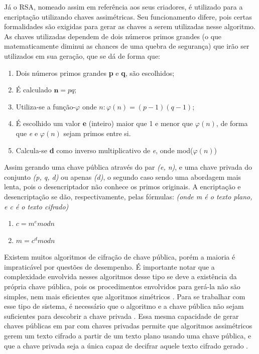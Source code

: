 	Já o RSA, nomeado assim em referência aos seus criadores, é utilizado para a encriptação utilizando chaves assimétricas. Seu funcionamento difere, pois certas formalidades são exigidas para gerar as chaves a serem utilizadas nesse algoritmo. As chaves utilizadas dependem de dois números primos grandes (o que matematicamente diminui as chances de uma quebra de segurança) que irão ser utilizados em sua geração, que se dá de forma que:
	
	\begin{enumerate}
		\item Dois números primos grandes \textbf{p} e \textbf{q}, são escolhidos;
		\item É calculado $\textbf{n} = pq$;
		\item Utiliza-se a função-$\varphi$ onde $n: \varphi(n) = (p-1)(q-1)$;
		\item É escolhido um valor \textbf{e} (inteiro) maior que 1 e menor que $\varphi(n)$, de forma que \textit{e} e $\varphi(n)$ sejam primos entre si.
		\item Calcula-se \textbf{d} como inverso multiplicativo de \textit{e}, onde mod($\varphi(n)$)
	\end{enumerate}
	
	Assim gerando uma chave pública através do par \textit{(e, n)}, e uma chave privada do conjunto \textit{(p, q, d)} ou apenas \textit{(d)}, o segundo caso sendo uma abordagem mais lenta, pois o desencriptador não conhece os primos originais. A encriptação e desencriptação se dão, respectivamente, pelas fórmulas: \textit{(onde m é o texto plano, e c é o texto cifrado)}
	
	\begin{enumerate}
		\item $c = m^e mod n$
		\item $m = c^d mod n$
	\end{enumerate}
	
	Existem muitos algoritmos de cifração de chave pública, porém a maioria é impraticável por questões de desempenho. É importante notar que a complexidade envolvida nesses algoritmos desse tipo se deve a existência da própria chave pública, pois os procedimentos envolvidos para gerá-la não são simples, nem mais eficientes que algoritmos simétricos \cite{stallings11}. Para se trabalhar com esse tipo de sistema, é necessário que o algoritmo e a chave pública não sejam suficientes para descobrir a chave privada \cite{pkcs8}. Essa mesma capacidade de gerar chaves públicas em par com chaves privadas permite que algoritmos assimétricos gerem um texto cifrado a partir de um texto plano usando uma chave pública, e que a chave privada seja a única capaz de decifrar aquele texto cifrado gerado \cite{pkcs1}.
	
